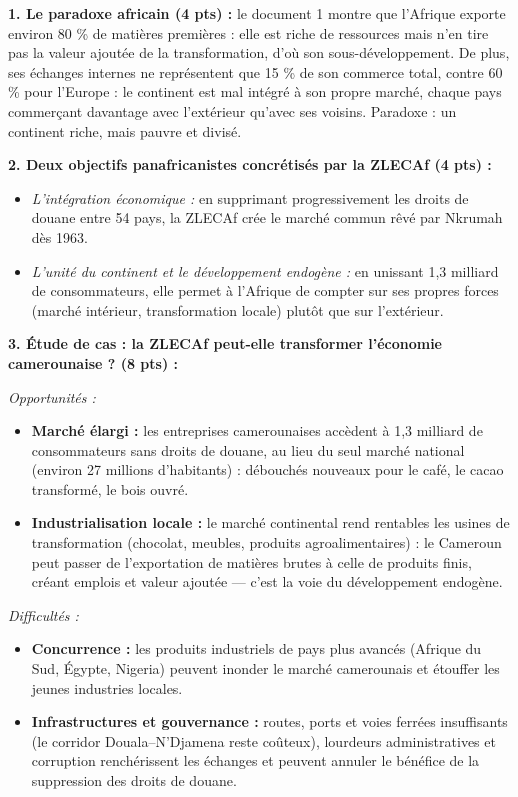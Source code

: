 \documentclass[11pt]{article}
\newcommand{\cle}[1]{{\popxbold\color{popdark}#1}}
\begin{document}
\begin{corrige}
\textbf{1. Le paradoxe africain (4 pts) :} le document 1 montre que l'Afrique exporte environ 80 \% de matières premières : elle est riche de ressources mais n'en tire pas la valeur ajoutée de la transformation, d'où son sous-développement. De plus, ses échanges internes ne représentent que 15 \% de son commerce total, contre 60 \% pour l'Europe : le continent est mal intégré à son propre marché, chaque pays commerçant davantage avec l'extérieur qu'avec ses voisins. Paradoxe : un continent riche, mais pauvre et divisé.

\textbf{2. Deux objectifs panafricanistes concrétisés par la ZLECAf (4 pts) :}
\begin{itemize}
\item \emph{L'intégration économique :} en supprimant progressivement les droits de douane entre 54 pays, la ZLECAf crée le marché commun rêvé par Nkrumah dès 1963.
\item \emph{L'unité du continent et le développement endogène :} en unissant 1,3 milliard de consommateurs, elle permet à l'Afrique de compter sur ses propres forces (marché intérieur, transformation locale) plutôt que sur l'extérieur.
\end{itemize}

\textbf{3. Étude de cas : la ZLECAf peut-elle transformer l'économie camerounaise ? (8 pts) :}

\emph{Opportunités :}
\begin{itemize}
\item \textbf{Marché élargi :} les entreprises camerounaises accèdent à 1,3 milliard de consommateurs sans droits de douane, au lieu du seul marché national (environ 27 millions d'habitants) : débouchés nouveaux pour le café, le cacao transformé, le bois ouvré.
\item \textbf{Industrialisation locale :} le marché continental rend rentables les usines de transformation (chocolat, meubles, produits agroalimentaires) : le Cameroun peut passer de l'exportation de matières brutes à celle de produits finis, créant emplois et valeur ajoutée — c'est la voie du \cle{développement endogène}.
\end{itemize}

\emph{Difficultés :}
\begin{itemize}
\item \textbf{Concurrence :} les produits industriels de pays plus avancés (Afrique du Sud, Égypte, Nigeria) peuvent inonder le marché camerounais et étouffer les jeunes industries locales.
\item \textbf{Infrastructures et gouvernance :} routes, ports et voies ferrées insuffisants (le corridor Douala--N'Djamena reste coûteux), lourdeurs administratives et corruption renchérissent les échanges et peuvent annuler le bénéfice de la suppression des droits de douane.
\end{itemize}


\end{corrige}
\end{document}
